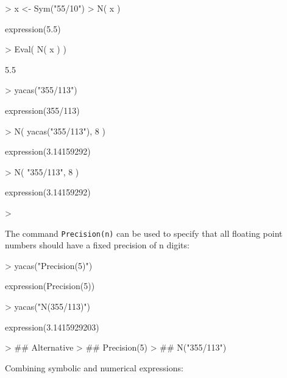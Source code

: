 \documentclass[10pt]{article}
\newcommand{\code}[1]{{\tt #1}}
\begin{document}
\begin{Schunk}
\begin{Sinput}
> x <- Sym("55/10")
> N( x )
\end{Sinput}
\begin{Soutput}
expression(5.5)
\end{Soutput}
\begin{Sinput}
> Eval( N( x ) )
\end{Sinput}
\begin{Soutput}
[1] 5.5
\end{Soutput}
\begin{Sinput}
> yacas("355/113")
\end{Sinput}
\begin{Soutput}
expression(355/113)
\end{Soutput}
\begin{Sinput}
> N( yacas("355/113"), 8 )
\end{Sinput}
\begin{Soutput}
expression(3.14159292)
\end{Soutput}
\begin{Sinput}
> N( "355/113", 8 )
\end{Sinput}
\begin{Soutput}
expression(3.14159292)
\end{Soutput}
\begin{Sinput}
> 
\end{Sinput}
\end{Schunk}


The command \code{Precision(n)}
can be used to specify that all floating point numbers should have a
fixed precision of n digits:
\begin{Schunk}
\begin{Sinput}
> yacas("Precision(5)")
\end{Sinput}
\begin{Soutput}
expression(Precision(5))
\end{Soutput}
\begin{Sinput}
> yacas("N(355/113)")
\end{Sinput}
\begin{Soutput}
expression(3.1415929203)
\end{Soutput}
\begin{Sinput}
> ## Alternative
> ## Precision(5)
> ## N("355/113")
\end{Sinput}
\end{Schunk}


Combining symbolic and numerical expressions:
\end{document}
